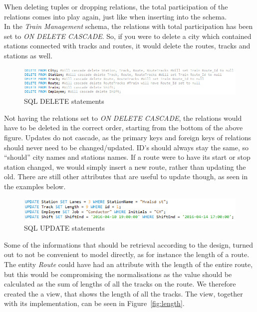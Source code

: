 When deleting tuples or dropping relations, the total participation of the 
relations comes into play again, just like when inserting into the schema.\\
In the \emph{Train Management} schema, the relations with total participation 
has been set to \emph{ON DELETE CASCADE}. So, if you were to delete a city 
which contained stations connected with tracks and routes, it would delete the 
routes, tracks and stations as well.\\

\begin{figure}[ht!]
    \centering
    \includegraphics[width=1\textwidth]{img/DELETE_Statements}
    \caption{SQL DELETE statements}
\end{figure}

Not having the relations set to \emph{ON DELETE CASCADE}, the relations would 
have to be deleted in the correct order, starting from the bottom of the above 
figure.
Updates do not cascade, as the primary keys and foreign keys of relations 
should never need to be changed/updated. ID's should always stay the same, so 
``should'' city names and stations names. If a route were to have its start or 
stop station changed, we would simply insert a new route, rather than updating 
the old.
There are still other attributes that are useful to update though, as seen in 
the examples below.

\begin{figure}[ht!]
    \centering
    \includegraphics[width=1\textwidth]{img/UPDATE_Statements}
    \caption{SQL UPDATE statements}
\end{figure}

Some of the informations that should be retrieval according to the design, 
turned out to not be convenient to model directly, as for instance the length 
of a route. The entity \emph{Route} could have had an attribute with the length 
of the entire route, but this would be compromising the normalisations as the 
value should be calculated as the sum of lengths of all the tracks on the 
route. We therefore created the a view, that shows the length of all the 
tracks. The view, together with its implementation, can be seen in 
Figure~\ref{fig:length}.


